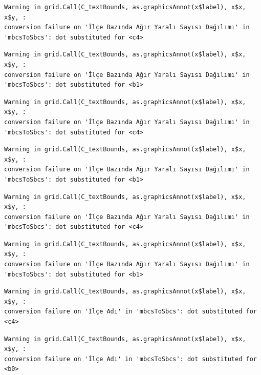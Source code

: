 \documentclass[
  11pt,
  a4paper,
  DIV=11,
  numbers=noendperiod]{scrartcl}
\begin{document}
\begin{verbatim}
Warning in grid.Call(C_textBounds, as.graphicsAnnot(x$label), x$x, x$y, :
conversion failure on 'İlçe Bazında Ağır Yaralı Sayısı Dağılımı' in
'mbcsToSbcs': dot substituted for <c4>
\end{verbatim}

\begin{verbatim}
Warning in grid.Call(C_textBounds, as.graphicsAnnot(x$label), x$x, x$y, :
conversion failure on 'İlçe Bazında Ağır Yaralı Sayısı Dağılımı' in
'mbcsToSbcs': dot substituted for <b1>
\end{verbatim}

\begin{verbatim}
Warning in grid.Call(C_textBounds, as.graphicsAnnot(x$label), x$x, x$y, :
conversion failure on 'İlçe Bazında Ağır Yaralı Sayısı Dağılımı' in
'mbcsToSbcs': dot substituted for <c4>
\end{verbatim}

\begin{verbatim}
Warning in grid.Call(C_textBounds, as.graphicsAnnot(x$label), x$x, x$y, :
conversion failure on 'İlçe Bazında Ağır Yaralı Sayısı Dağılımı' in
'mbcsToSbcs': dot substituted for <b1>
\end{verbatim}

\begin{verbatim}
Warning in grid.Call(C_textBounds, as.graphicsAnnot(x$label), x$x, x$y, :
conversion failure on 'İlçe Bazında Ağır Yaralı Sayısı Dağılımı' in
'mbcsToSbcs': dot substituted for <c4>
\end{verbatim}

\begin{verbatim}
Warning in grid.Call(C_textBounds, as.graphicsAnnot(x$label), x$x, x$y, :
conversion failure on 'İlçe Bazında Ağır Yaralı Sayısı Dağılımı' in
'mbcsToSbcs': dot substituted for <b1>
\end{verbatim}

\begin{verbatim}
Warning in grid.Call(C_textBounds, as.graphicsAnnot(x$label), x$x, x$y, :
conversion failure on 'İlçe Adı' in 'mbcsToSbcs': dot substituted for <c4>
\end{verbatim}

\begin{verbatim}
Warning in grid.Call(C_textBounds, as.graphicsAnnot(x$label), x$x, x$y, :
conversion failure on 'İlçe Adı' in 'mbcsToSbcs': dot substituted for <b0>
\end{verbatim}
\end{document}
